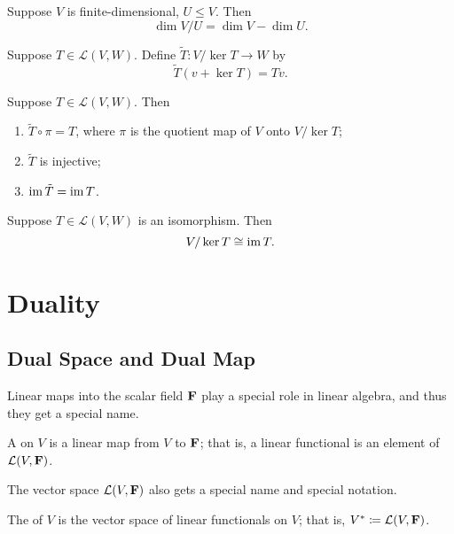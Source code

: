 \begin{proposition}
Suppose $V$ is finite-dimensional, $U\le V$. Then
\[\dim V/U=\dim V-\dim U.\]
\end{proposition}

\begin{definition}
Suppose $T\in\mathcal{L}(V,W)$. Define $\tilde{T}:V/\ker T\to W$ by
\[\tilde{T}(v+\ker T)=Tv.\]
\end{definition}

\begin{proposition}
Suppose $T\in\mathcal{L}(V,W)$. Then
\begin{enumerate}[label=(\roman*)]
\item $\tilde{T}\circ\pi=T$, where $\pi$ is the quotient map of $V$ onto $V/\ker T$;
\item $\tilde{T}$ is injective;
\item $\operatorname{im}\tilde{T}=\operatorname{im} T$.
\end{enumerate}
\end{proposition}

\begin{theorem}
Suppose $T\in\mathcal{L}(V,W)$ is an isomorphism. Then
\begin{equation}
V/\ker T\cong\operatorname{im} T.
\end{equation}
\end{theorem}


\pagebreak

\section{Duality}
\subsection{Dual Space and Dual Map}
Linear maps into the scalar field $\mathbf F$ play a special role in linear algebra, and thus they get a special name.

\begin{definition}
A  on $V$ is a linear map from $V$ to $\mathbf F$; that is, a linear functional is an element of $\mathcal{L}(V,\mathbf F)$.
\end{definition}

The vector space $\mathcal{L}(V,\mathbf F)$ also gets a special name and special notation.

\begin{definition}
The  of $V$ is the vector space of linear functionals on $V$; that is, $V^*\coloneqq\mathcal{L}(V,\mathbf F)$.
\end{definition}

